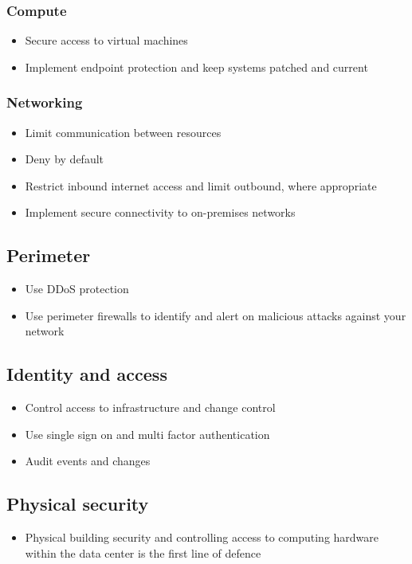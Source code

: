 \documentclass{article}[18pt]
\begin{document}
\subsubsection{Compute}
\begin{itemize}
	\item Secure access to virtual machines
	\item Implement endpoint protection and keep systems patched and current
\end{itemize}
\subsubsection{Networking}
\begin{itemize}
	\item Limit communication between resources
	\item Deny by default
	\item Restrict inbound internet access and limit outbound, where appropriate
	\item Implement secure connectivity to on-premises networks
\end{itemize}
\subsection{Perimeter}
\begin{itemize}
	\item Use DDoS protection
	\item Use perimeter firewalls to identify and alert on malicious attacks against your network
\end{itemize}
\subsection{Identity and access}
\begin{itemize}
	\item Control access to infrastructure and change control
	\item Use single sign on and multi factor authentication
	\item Audit events and changes
\end{itemize}
\subsection{Physical security}
\begin{itemize}
	\item Physical building security and controlling access to computing hardware within the data center is the first line of defence
\end{itemize}
\end{document}
